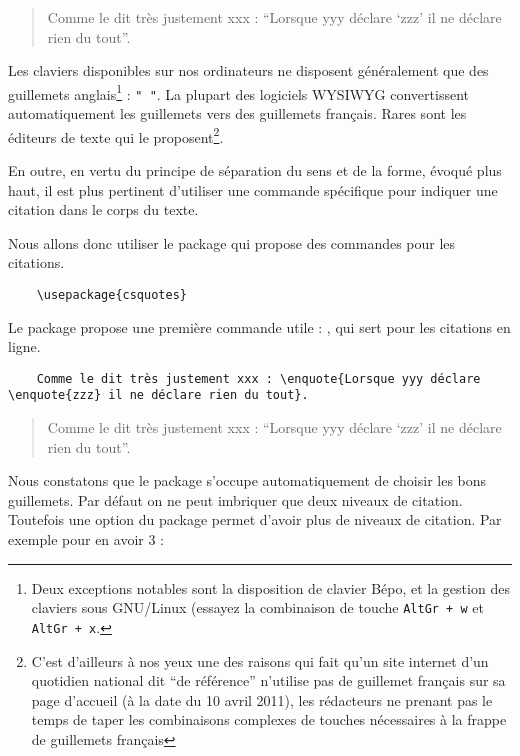 \begin{quotation}
	Comme le dit très justement xxx : \enquote{Lorsque yyy déclare \enquote{zzz} il ne déclare rien du tout}.
\end{quotation}

Les claviers disponibles sur nos ordinateurs ne disposent généralement que des guillemets anglais\footnote{Deux exceptions notables sont la disposition de clavier Bépo, et la gestion des claviers sous GNU/Linux (essayez la combinaison de touche \verb|AltGr + w| et \verb|AltGr + x|.} : \verb|" "|. 
La plupart des logiciels WYSIWYG convertissent automatiquement les guillemets vers des guillemets français. Rares sont les éditeurs de texte qui le proposent\footnote{C'est d'ailleurs à nos yeux une des raisons qui fait qu'un site internet d'un quotidien national dit \enquote{de référence} n'utilise pas de guillemet français sur sa page d'accueil (à la date du 10 avril 2011), les rédacteurs ne prenant pas le temps de taper les combinaisons complexes de touches nécessaires à la frappe de guillemets français}. 

En outre, en vertu du principe de séparation du sens et de la forme, évoqué plus haut, il est plus pertinent d'utiliser une commande spécifique pour indiquer une citation dans le corps du texte.

Nous allons donc utiliser le package  qui propose des commandes  pour les citations.

\begin{verbatim}
	\usepackage{csquotes}
\end{verbatim}

Le package propose une première commande utile : , qui sert pour les citations en ligne.

\begin{verbatim}
	Comme le dit très justement xxx : \enquote{Lorsque yyy déclare \enquote{zzz} il ne déclare rien du tout}.
\end{verbatim}


\begin{quotation}
	Comme le dit très justement xxx : \enquote{Lorsque yyy déclare \enquote{zzz} il ne déclare rien du tout}.
\end{quotation}


Nous constatons que le package s'occupe automatiquement de choisir les bons guillemets. Par défaut on ne peut imbriquer que deux niveaux de citation. Toutefois une option du package permet d'avoir plus de niveaux de citation. Par exemple pour en avoir 3 : 

